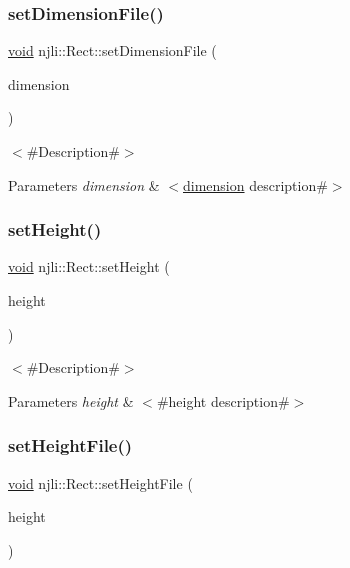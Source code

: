 \subsubsection{\texorpdfstring{set\+Dimension\+File()}{setDimensionFile()}}
{\footnotesize\ttfamily \mbox{\hyperlink{_thread_8h_af1e856da2e658414cb2456cb6f7ebc66}{void}} njli\+::\+Rect\+::set\+Dimension\+File (\begin{DoxyParamCaption}\item[{const bt\+Vector2 \&}]{dimension }\end{DoxyParamCaption})}

$<$\#\+Description\#$>$


\begin{DoxyParams}{Parameters}
{\em dimension} & $<$\mbox{\hyperlink{classnjli_1_1_rect_a1f9f935a849b021e525e470c9b4b27aa}{dimension}} description\#$>$ \\
\hline
\end{DoxyParams}
\mbox{\label{classnjli_1_1_rect_a0f649ffe61c054d305651b14e6239a9e}} 
\subsubsection{\texorpdfstring{set\+Height()}{setHeight()}}
{\footnotesize\ttfamily \mbox{\hyperlink{_thread_8h_af1e856da2e658414cb2456cb6f7ebc66}{void}} njli\+::\+Rect\+::set\+Height (\begin{DoxyParamCaption}\item[{const \mbox{\hyperlink{_util_8h_a5f6906312a689f27d70e9d086649d3fd}{f32}}}]{height }\end{DoxyParamCaption})}

$<$\#\+Description\#$>$


\begin{DoxyParams}{Parameters}
{\em height} & $<$\#height description\#$>$ \\
\hline
\end{DoxyParams}
\mbox{\label{classnjli_1_1_rect_ad6c24fa78959ace89e20e153e1e10c00}} 
\subsubsection{\texorpdfstring{set\+Height\+File()}{setHeightFile()}}
{\footnotesize\ttfamily \mbox{\hyperlink{_thread_8h_af1e856da2e658414cb2456cb6f7ebc66}{void}} njli\+::\+Rect\+::set\+Height\+File (\begin{DoxyParamCaption}\item[{const \mbox{\hyperlink{_util_8h_a5f6906312a689f27d70e9d086649d3fd}{f32}}}]{height }\end{DoxyParamCaption})}

